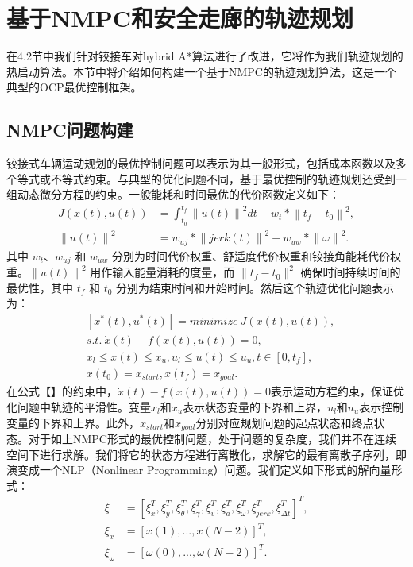 \documentclass[master,academic]{ysuthesis} %
\begin{document}
	\section{基于NMPC和安全走廊的轨迹规划}
	在4.2节中我们针对铰接车对hybrid A*算法进行了改进，它将作为我们轨迹规划的热启动算法。本节中将介绍如何构建一个基于NMPC的轨迹规划算法，这是一个典型的OCP最优控制框架。
		\subsection{NMPC问题构建}
		铰接式车辆运动规划的最优控制问题可以表示为其一般形式，包括成本函数以及多个等式或不等式约束。与典型的优化问题不同，基于最优控制的轨迹规划还受到一组动态微分方程的约束。一般能耗和时间最优的代价函数定义如下：
		\begin{equation}
			\begin{aligned}
				J(x(t),u(t)) &= \int_{t_0}^{t_f}
				\left\| u(t)\right\|^2dt +w_t*\left\|t_f-t_0\right\|^2,    \\
				\left\|u(t)\right\|^2&=w_{uj}*\left\|jerk(t)\right\|^2+w_{uw}*\left\|\omega\right\|^2.
			\end{aligned} 
		\end{equation}
		其中 $w_t$、$w_{uj}$ 和 $w_{uw}$ 分别为时间代价权重、舒适度代价权重和铰接角能耗代价权重。$\left\|u(t)\right\|^2$ 用作输入能量消耗的度量，而 $\|t_f- t_0\|^2$ 确保时间持续时间的最优性，其中 $t_f$ 和 $t_0$ 分别为结束时间和开始时间。然后这个轨迹优化问题表示为：
		\begin{equation}
			\begin{aligned}
				&\left[x^*(t),u^*(t)\right] = minimize\ J(x(t),u(t)),\\      
				&s.t.\ \dot x(t)-f(x(t),u(t))=0,\\
				&x_l \leq x(t) \leq x_u, u_l \leq u(t) \leq u_u,t\in \left[0,t_f\right],\\
				&x(t_0)=x_{start},x(t_f)=x_{goal}.\label{4}
			\end{aligned}   
		\end{equation}
		在公式【】的约束中，$\dot x(t)-f(x(t),u(t))=0$表示运动方程约束，保证优化问题中轨迹的平滑性。变量$x_l$和$x_u$表示状态变量的下界和上界，$u_l$和$u_u$表示控制变量的下界和上界。此外，$x_{start}$和$x_{goal}$分别对应规划问题的起点状态和终点状态。对于如上NMPC形式的最优控制问题，处于问题的复杂度，我们并不在连续空间下进行求解。我们将它的状态方程进行离散化，求解它的最有离散子序列，即演变成一个NLP（Nonlinear Programming）问题。我们定义如下形式的解向量形式：
		\begin{equation}
			\begin{aligned}
				\xi &=\left[ \xi _{x}^{T},\xi _{y}^{T},\xi _{\theta}^{T},\xi _{\gamma}^{T},\xi _{v}^{T},\xi _{a}^{T},\xi _{\omega}^{T},\xi_{{jerk}}^{T},\xi _{\Delta t}^{T} \right] ^T,\\
				\xi _x&=\left[ x\left( 1 \right) ,...,x\left( N-2 \right) \right] ^T,\\
				\xi _{\omega}&=\left[ \omega \left( 0 \right) ,...,\omega \left( N-2 \right) \right] ^T.
			\end{aligned}   
		\end{equation}
\end{document}

